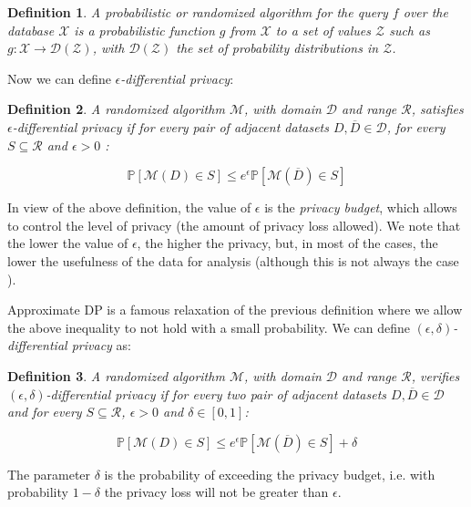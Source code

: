 \documentclass[5p,times]{elsarticle}
\newtheorem{definition}{Definition}
\begin{document}
\begin{definition}
    A probabilistic or randomized algorithm for the query $f$ over the database $\mathcal{X}$ is a probabilistic function $g$ from $\mathcal{X}$ to a set of values $\mathcal{Z}$ such as $g:\mathcal{X} \longrightarrow \mathcal{D(Z)}$, with $\mathcal{D(Z)}$ the set of probability distributions in $\mathcal{Z}$.    
\end{definition}

Now we can define $\epsilon$\textit{-differential privacy}:

\begin{definition}
A randomized algorithm $\mathcal{M}$, with domain $\mathcal{D}$ and range $\mathcal{R}$, satisfies $\epsilon$-differential privacy if for every pair of adjacent datasets $D,\overline{D} \in \mathcal{D}$, for every $S \subseteq \mathcal{R}$ and $\epsilon>0$ :

$$
\mathbb{P}[\mathcal{M}(D)\in S] \leq e^{\epsilon}\mathbb{P}[\mathcal{M}(\overline{D})\in S]
$$    
\end{definition}

In view of the above definition, the value of $\epsilon$ is the \emph{privacy budget}, which allows to control the level of privacy (the amount of privacy loss allowed). We  note that the lower the value of $\epsilon$, the higher the privacy, but, in most of the cases, the lower the usefulness of the data for analysis (although this is not always the case \cite{natasha_dp_e_utility}).

 Approximate DP is a famous relaxation of the previous definition where we allow the above inequality to not hold with a small probability. We can define $(\epsilon,\delta)$\textit{-differential privacy} as:

\begin{definition}
A randomized algorithm $\mathcal{M}$, with domain $\mathcal{D}$ and range $\mathcal{R}$, verifies $(\epsilon,\delta)$-differential privacy if for every two pair of adjacent datasets $D,\overline{D} \in \mathcal{D}$ and for every $S \subseteq \mathcal{R}$, $\epsilon>0$ and $\delta\in [0,1]$:

$$
\mathbb{P}[\mathcal{M}(D)\in S] \leq e^{\epsilon}\mathbb{P}[\mathcal{M}(\overline{D})\in S] +\delta
$$    
\end{definition}
 
The parameter $\delta$ is the probability of exceeding the privacy budget, i.e. with probability $1-\delta$ the privacy loss will not be greater than $\epsilon$.
\end{document}
